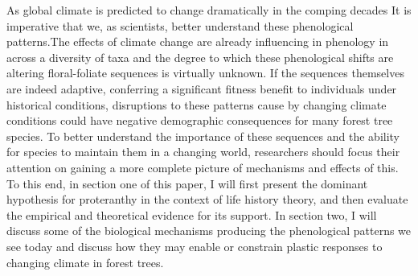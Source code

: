 \documentclass{article}\usepackage[]{graphicx}\usepackage[]{color}
\begin{document}
\par As global climate is predicted to change dramatically in the comping decades It is imperative that we, as scientists, better understand these phenological patterns.The effects of climate change are already influencing in phenology in across a diversity of taxa \citep{Menzel2006} and the degree to which these phenological shifts are altering floral-foliate sequences is virtually unknown. If the sequences themselves are indeed adaptive, conferring a significant fitness benefit to individuals under historical conditions, disruptions to these patterns cause by changing climate conditions could have negative demographic consequences for many forest tree species. To better understand the importance of these sequences and the ability for species to maintain them in a changing world, researchers should focus their attention on gaining a more complete picture of mechanisms and effects of this. To this end, in section one of this paper, I will first present the dominant hypothesis for proteranthy in the context of life history theory, and then evaluate the empirical and theoretical evidence for its support. In section two, I will discuss some of the biological mechanisms producing the phenological patterns we see today and discuss how they may enable or constrain plastic responses to changing climate in forest trees.
\end{document}
